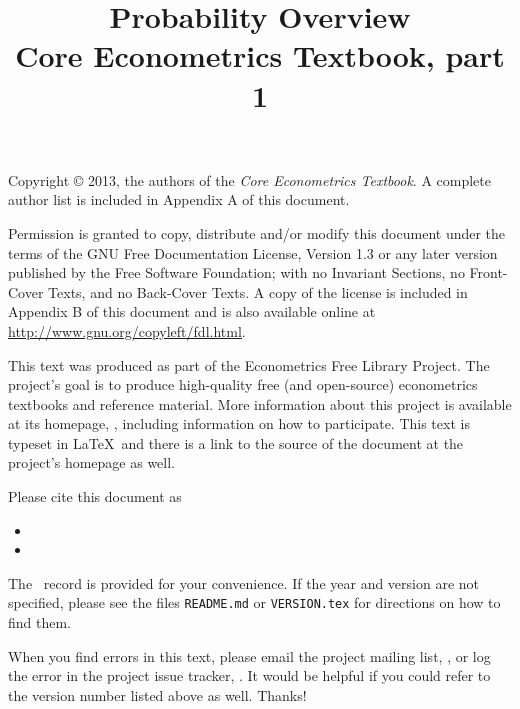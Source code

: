 \documentclass[nohyper]{external/tufte-handout}
\title[Probability overview]%
{Probability Overview \\
  Core Econometrics Textbook, part 1}
\begin{document}
\maketitle

\bigskip\noindent%
Copyright © 2013, the authors of the \textit{Core Econometrics Textbook}.
A complete author list is included in Appendix A of this document.

Permission is granted to copy, distribute and/or modify this document
under the terms of the GNU Free Documentation License, Version 1.3 or
any later version published by the Free Software Foundation; with no
Invariant Sections, no Front-Cover Texts, and no Back-Cover Texts.  A
copy of the license is included in Appendix B of this document and is
also available online at \url{http://www.gnu.org/copyleft/fdl.html}.

This text was produced as part of the Econometrics Free Library
Project.  The project's goal is to produce high-quality free (and
open-source) econometrics textbooks and reference material.  More
information about this project is available at its homepage,
\homepage, including information on how
to participate.  This text is typeset in \LaTeX\ and there is a link
to the source of the document at the project's homepage as well.

Please cite this document as
\begin{itemize}
\item[] 
\item[] 
\end{itemize}
The \BibTeX\ record is provided for your convenience.
If the year and version are not specified, please see the files
\texttt{README.md} or \texttt{VERSION.tex} for directions on how to
find them.

When you find errors in this text, please email the project mailing
list, \maillist, or log the error in the project issue tracker,
\bugtrack.  It would be helpful if you could refer to the version
number listed above as well.  Thanks!

\tableofcontents
\listoftables
\listoffigures






\end{document}
